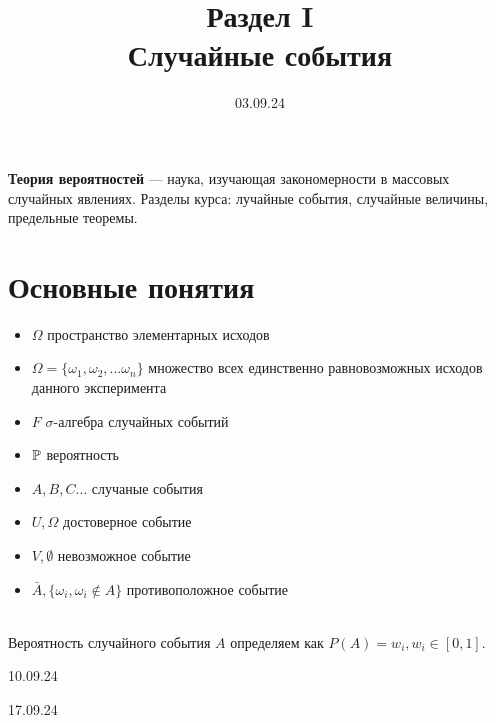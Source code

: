 

\title{Раздел I \\
       Случайные события}
\date{03.09.24}


    \maketitle
    
    \textbf{Теория вероятностей} — наука, изучающая закономерности 
    в массовых случайных явлениях. Разделы курса: лучайные события, случайные 
    величины, предельные теоремы.

    \section{Основные понятия}

    \begin{itemize}
        \item \(\Omega\) пространство элементарных исходов 
        \item \(\Omega = \{\omega_1, \omega_2, ... \omega_n\}\)
        множество всех единственно равновозможных исходов данного эксперимента
        \item \(F\) \(\sigma\)-алгебра случайных событий
        \item \(\mathbb{P}\) вероятность
        \\
        \item \(A, B, C\dots\) случаные события
        \item \(U, \Omega\) достоверное событие
        \item \(V, \emptyset\) невозможное событие
        \item \(\bar A, \{\omega_i, \omega_i \notin A\}\) противоположное событие
    \end{itemize}
    \\
    Вероятность случайного события \(A\) определяем как \(P(A) = w_i, w_i \in [0,1]\).
    


    \vspace{2cm}
    \centering\large{10.09.24}



    \vspace{2cm}
    \centering\large{17.09.24}

